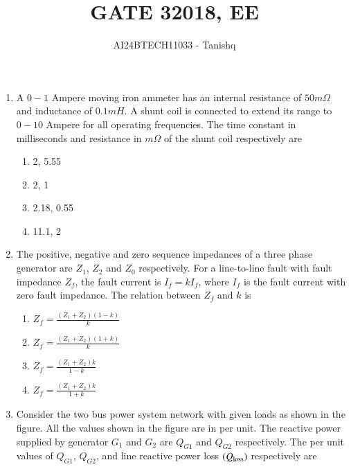 \documentclass[journal]{IEEEtran}
\begin{document}

\vspace{3cm}
\author{AI24BTECH11033 - Tanishq}
\title{GATE 3}
{\let\newpage\relax\maketitle}
\title{2018, EE}
\renewcommand{\thefigure}{\theenumi}
\renewcommand{\thetable}{\theenumi}
\setlength{\intextsep}{10pt} %
\renewcommand{\thetable}{\theenumi}
\begin{enumerate}
\item A $0-1$ Ampere moving iron ammeter has an internal resistance of $50 m\Omega$ and inductance of $0.1 mH$. A shunt coil is connected to extend its range to $0-10$ Ampere for all operating frequencies. The time constant in milliseconds and resistance in $m\Omega$ of the shunt coil respectively are
\begin{enumerate}
      \item 2, 5.55
      \item 2, 1
      \item 2.18, 0.55
      \item 11.1, 2
  \end{enumerate}
  \item The positive, negative and zero sequence impedances of a three phase generator are $Z_1$, $Z_2$ and $Z_0$ respectively. For a line-to-line fault with fault impedance $Z_f$, the fault current is $I_f = k I_f$, where $I_f$ is the fault current with zero fault impedance. The relation between $Z_f$ and $k$ is
\begin{enumerate}
    \item $Z_f = \frac{(Z_1 + Z_2)(1 - k)}{k}$
    \item $Z_f = \frac{(Z_1 + Z_2)(1 + k)}{k}$
    \item $Z_f = \frac{(Z_1 + Z_2) k}{1 - k}$
    \item $Z_f = \frac{(Z_1 + Z_2) k}{1 + k}$
\end{enumerate}
\item Consider the two bus power system network with given loads as shown in the figure. All the values shown in the figure are in per unit. The reactive power supplied by generator $G_1$ and $G_2$ are $Q_{G1}$ and $Q_{G2}$ respectively. The per unit values of $Q_{G1}$, $Q_{G2}$, and line reactive power loss $\left(Q_{\text{loss}}\right)$ respectively are

\end{enumerate}
\end{document}
